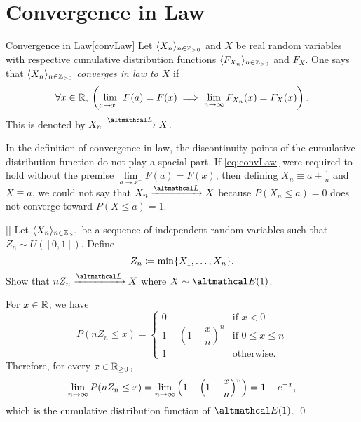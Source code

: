 \documentclass[../probability.tex]{subfiles}
\begin{document}
\section{Convergence in Law}

\begin{Definition}{Convergence in Law}[convLaw]
    Let \(\lang X_n \rang_{n \in \ZZ_{>0}}\)
    and \(X\) be real random variables with respective cumulative distribution functions
    \(\lang F_{X_n} \rang_{n \in \ZZ_{>0}}\) and \(F_X\).
    One says that \(\lang X_n \rang_{n \in \ZZ_{>0}}\) \emph{converges in law to \(X\)}
    if
    \begin{equation}\label{eq:convLaw}
        \fall x \in \RR,\: \left( \lim_{a \to x^-} F(a) = F(x) \implies
        \lim_{n \to \infty} F_{X_n}(x) = F_X(x) \right)\text.
    \end{equation}
    This is denoted by \(X_n \lawconv X\).
\end{Definition}

\begin{note}
    In the definition of convergence in law,
    the discontinuity points of the cumulative distribution function
    do not play a spacial part. If \eqref{eq:convLaw} were
    required to hold without the premise \(\lim\limits_{a \to x^-} F(a) = F(x)\),
    then defining \(X_n \equiv a + \frac{1}{n}\) and \(X \equiv a\),
    we could not say that \(X_n \lawconv X\) because \(P(X_n \le a) = 0\)
    does not converge toward \(P(X \le a) = 1\).
\end{note}

\begin{Exercise}{}[]
    Let \(\lang X_n \rang_{n \in \ZZ_{>0}}\) be a sequence of independent random variables such that
    \(Z_n \sim U([0,1])\). Define
    \[
        Z_n \coloneqq \min \{X_1, \ldots, X_n\}\text.
    \]
    Show that \(n Z_n \lawconv X\) where \(X \sim \mcal{E}(1)\).
\end{Exercise}
\begin{solution}
    For \(x \in \RR\), we have
    \[
        P( n Z_n \le x ) =
        \begin{cases}
            0 & \text{if } x < 0 \\
            1-\left(1-\dfrac{x}{n}\right)^{n} & \text{if } 0 \le x \le n \\
            1 & \text{otherwise.}
        \end{cases}
    \]
    Therefore, for every \(x \in \RR_{\ge 0}\),
    \[
        \lim_{n \to \infty} P(n Z_n \le x)
        = \lim_{n \to \infty} \left(1-\left(1-\frac{x}{n}\right)^{n}\right) = 1 - e^{-x}\text,
    \]
    which is the cumulative distribution function of \(\mcal{E}(1)\).
    \qed
\end{solution}
\end{document}
